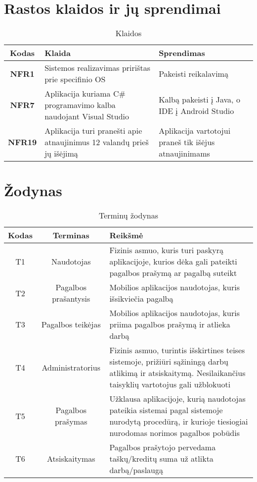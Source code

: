 \documentclass{VUMIFPSbakalaurinis}
\begin{document}
\section{Rastos klaidos ir jų sprendimai}
\begin{table}[H]\footnotesize
	\centering
	\caption{Klaidos}
	{
	\setlength{\arrayrulewidth}{0.25mm}
	{\begin{tabular}{|c|m{5.75cm}|m{5.75cm}|} \hline
	Kodas & Klaida & Sprendimas \\
	\hline
	\textbf{NFR1} & Sistemos realizavimas pririštas prie specifinio OS & Pakeisti reikalavimą \\
	\textbf{NFR7} & Aplikacija kuriama C\# programavimo kalba naudojant Visual Studio & Kalbą pakeisti į Java, o IDE į Android Studio \\
	\textbf{NFR19} & Aplikacija turi pranešti apie atnaujinimus 12 valandų prieš jų išėjimą & Aplikacija vartotojui praneš tik išėjus atnaujinimams \\
	\hline
	\end{tabular}}
	}
	\label{tab:table example}
\end{table}

\section{Žodynas}
\begin{table}[H]\footnotesize
	\centering
	\caption{Terminų žodynas}
	{
	\setlength{\arrayrulewidth}{0.25mm}
	{\begin{tabular}{|c|c|m{11.5cm}|} \hline
	Kodas & Terminas & Reikšmė \\
	\hline
	T1 & Naudotojas & Fizinis asmuo, kuris turi paskyrą aplikacijoje, kurios dėka gali pateikti pagalbos prašymą ar pagalbą suteikt \\
	T2 & Pagalbos prašantysis & Mobilios aplikacijos naudotojas, kuris išsikviečia pagalbą \\
	T3 & Pagalbos teikėjas & Mobilios aplikacijos naudotojas, kuris  priima pagalbos prašymą ir atlieka darbą \\
	T4 & Administratorius & Fizinis asmuo, turintis išskirtines teises sistemoje, prižiūri sąžiningą darbų atlikimą ir atsiskaitymą. Nesilaikančius taisyklių vartotojus gali užblokuoti \\
	T5 & Pagalbos prašymas & Užklausa aplikacijoje, kurią naudotojas pateikia sistemai pagal sistemoje nurodytą procedūrą, ir kurioje tiesiogiai nurodomas norimos pagalbos pobūdis \\
	T6 & Atsiskaitymas & Pagalbos prašytojo pervedama taškų/kreditų suma už atlikta darbą/paslaugą \\
	\hline
	\end{tabular}}
	}
	\label{tab:table example}
\end{table}
	
\end{document}
